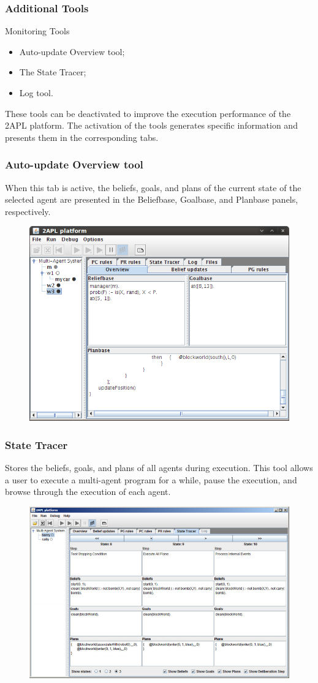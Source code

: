 	
	\begin{frame}
		\frametitle{Additional Tools}
		\begin{block}{Monitoring Tools}
			\begin{itemize}
				\item Auto-update Overview tool;
				\item The State Tracer;
				\item Log tool.
			\end{itemize} 
		\end{block}
		
		These tools can be deactivated to improve the execution performance of the 2APL platform. The activation of the tools generates specific information and presents them in the corresponding tabs. 
		
	\end{frame}
	
	\begin{frame}
		\frametitle{Auto-update Overview tool}
		When this tab is active, the beliefs, goals, and plans of the current state of the selected agent are presented in the Beliefbase, Goalbase, and Planbase panels, respectively.
		
		\begin{figure}
			\includegraphics[width=0.65\linewidth]{images/2APLplatform.png}
		\end{figure}
	\end{frame}
	
	\begin{frame}
		\frametitle{State Tracer}
		Stores the beliefs, goals, and plans of all agents during execution. This tool allows a user to execute a multi-agent program for a while, pause the execution, and browse through the execution of each agent.
		
		\begin{figure}
			\includegraphics[width=0.65\linewidth]{images/2APLStateTracer.png}
		\end{figure}
	\end{frame}
	

